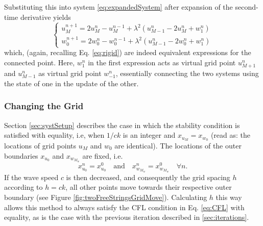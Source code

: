 \documentclass[dvipsnames, reprint]{JASA}
\def\SWcomment[#1]{\textcolor{Bittersweet}{#1}}
\begin{document}
Substituting this into system \eqref{eq:expandedSystem} after expansion of the second-time derivative yields
\begin{equation}\label{eq:resultOneConnectedPoint}
    \!\begin{cases}
    u^{n+1}_M = 2u_M^n - u_M^{n-1} + \lambda^2(u_{M-1}^n-2u_M^n+w_1^n)\\
    w^{n+1}_0 = 2w_0^n - w_0^{n-1} + \lambda^2(u_{M-1}^n-2w_0^n+w_1^n)
    \end{cases}
\end{equation}
which, (again, recalling Eq. \eqref{eq:rigid}) are indeed equivalent expressions for the connected point. Here, $w_1^n$ in the first expression acts as virtual grid point $u_{M+1}^n$ and $u_{M-1}^n$ as virtual grid point $w_{-1}^n$, essentially connecting the two systems using the state of one in the update of the other.

\subsubsection{Changing the Grid}
Section \ref{sec:systSetup} describes the case in which the stability condition is satisfied with equality, i.e, when $1/ck$ is an integer and $x_{u_M} = x_{w_0}$ \SWcomment[(read as: the locations of grid points $u_M$ and $w_0$ are identical)]. The locations of the outer boundaries $x_{u_0}$ and $x_{w_{M_w}}$ are fixed, i.e.
\begin{equation}
    x_{u_0}^n = x_{u_0}^0 \quad \text{and}\quad x_{w_{M_w}}^n = x_{w_{M_w}}^0 \quad \forall n.
\end{equation}
If the wave speed $c$ is then decreased, and consequently the grid spacing $h$ according to $h=ck$, all other points move towards their respective outer boundary (see Figure \ref{fig:twoFreeStringsGridMove}). Calculating $h$ this way allows this method to always satisfy the CFL condition in Eq. \eqref{eq:CFL} with equality, as is the case with the previous iteration described in \ref{sec:iterations}.
\end{document}
